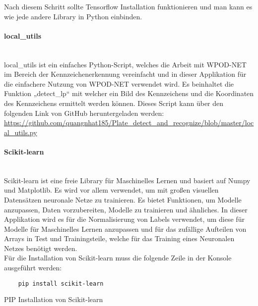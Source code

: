 Nach diesem Schritt sollte Tensorflow Installation funktionieren und man kann es wie jede andere Library in Python einbinden.

\paragraph{local{\_}utils}\mbox{}\\
local{\_}utils ist ein einfaches Python-Script, welches die Arbeit mit WPOD-NET im Bereich der Kennzeichenerkennung vereinfacht 
und in dieser Applikation für die einfachere Nutzung von WPOD-NET verwendet wird. Es beinhaltet die Funktion „detect{\_}lp“ mit 
welcher ein Bild des Kennzeichens und die Koordinaten des Kennzeichens ermittelt werden können. Dieses Script kann über den 
folgenden Link von GitHub heruntergeladen werden: \url{https://github.com/quangnhat185/Plate_detect_and_recognize/blob/master/local_utils.py} 

\paragraph{Scikit-learn}\mbox{}\\
Scikit-learn ist eine freie Library für Maschinelles Lernen und basiert auf Numpy und Matplotlib. Es wird vor allem verwendet, 
um mit großen visuellen Datensätzen neuronale Netze zu trainieren.  Es bietet Funktionen, um Modelle anzupassen, Daten vorzubereiten, 
Modelle zu trainieren und ähnliches. In dieser Applikation wird es für die Normalisierung von Labels verwendet, um diese für Modelle für Maschinelles Lernen anzupassen und für das zufällige Aufteilen von Arrays in Test und Trainingsteile, welche für das Training eines Neuronalen Netzes benötigt werden.\\

Für die Installation von Scikit-learn muss die folgende Zeile in der Konsole ausgeführt werden:

\begin{listing}[H]
    \begin{verbatim}
    pip install scikit-learn
    \end{verbatim}
    \caption{PIP Installation von Scikit-learn}
\end{listing}

